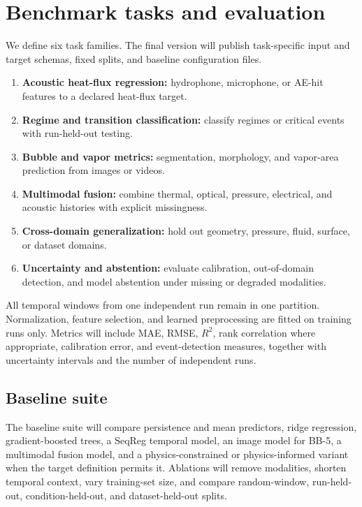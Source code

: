 \documentclass[11pt]{article}
\begin{document}
\section{Benchmark tasks and evaluation}
\label{sec:tasks}

We define six task families. The final version will publish task-specific input and target schemas, fixed splits, and baseline configuration files.

\begin{enumerate}
  \item \textbf{Acoustic heat-flux regression:} hydrophone, microphone, or AE-hit features to a declared heat-flux target.
  \item \textbf{Regime and transition classification:} classify regimes or critical events with run-held-out testing.
  \item \textbf{Bubble and vapor metrics:} segmentation, morphology, and vapor-area prediction from images or videos.
  \item \textbf{Multimodal fusion:} combine thermal, optical, pressure, electrical, and acoustic histories with explicit missingness.
  \item \textbf{Cross-domain generalization:} hold out geometry, pressure, fluid, surface, or dataset domains.
  \item \textbf{Uncertainty and abstention:} evaluate calibration, out-of-domain detection, and model abstention under missing or degraded modalities.
\end{enumerate}

All temporal windows from one independent run remain in one partition. Normalization, feature selection, and learned preprocessing are fitted on training runs only. Metrics will include MAE, RMSE, $R^2$, rank correlation where appropriate, calibration error, and event-detection measures, together with uncertainty intervals and the number of independent runs.

\subsection{Baseline suite}

The baseline suite will compare persistence and mean predictors, ridge regression, gradient-boosted trees, a SeqReg temporal model, an image model for BB-5, a multimodal fusion model, and a physics-constrained or physics-informed variant when the target definition permits it. Ablations will remove modalities, shorten temporal context, vary training-set size, and compare random-window, run-held-out, condition-held-out, and dataset-held-out splits.
\end{document}
